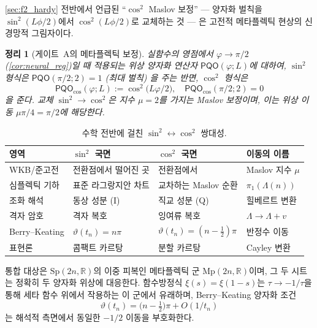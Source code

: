 \documentclass[11pt, a4paper]{article}
\theoremstyle{definition}
\theoremstyle{plain}
\newtheorem{theorem}{정리}[section]
\newcommand{\xif}{\xi}
\newcommand{\PQO}{\mathsf{PQO}}
\begin{document}
\cref{sec:f2_hardy} 전반에서 언급된 ``$\cos^2$ Maslov 보정'' --- 양자화 벌칙을 $\sin^2(L\phi/2)$에서 $\cos^2(L\phi/2)$로 교체하는 것 --- 은 고전적 메타플렉틱 현상의 신경망적 그림자이다.

\begin{theorem}[게이트~A의 메타플렉틱 보정]
\label{thm:maslov}
실함수의 영점에서 $\varphi\to\pi/2$ (\cref{cor:neural_reg})일 때 적용되는 위상 양자화 연산자 $\PQO(\varphi; L)$에 대하여, $\sin^2$ 형식은 $\PQO(\pi/2; 2) = 1$ (최대 벌칙) 을 주는 반면, $\cos^2$ 형식은
\begin{equation}\label{eq:pqo_cos_thm}
  \PQO_{\cos}(\varphi; L) := \cos^2\!\bigl(L\varphi/2\bigr),
  \quad \PQO_{\cos}(\pi/2; 2) = 0
\end{equation}
을 준다. 교체 $\sin^2\to\cos^2$은 지수 $\mu=2$를 가지는 \emph{Maslov 보정}이며, 이는 위상 이동 $\mu\pi/4=\pi/2$에 해당한다.
\end{theorem}

\begin{table}[ht]
\centering
\caption{수학 전반에 걸친 $\sin^2\leftrightarrow\cos^2$ 쌍대성.}
\label{tab:maslov_duality}
\small
\begin{tabular}{@{}p{3cm}|p{3.8cm}|p{3.8cm}|p{3cm}@{}}
\toprule
\textbf{영역} & \textbf{$\sin^2$ 국면} & \textbf{$\cos^2$ 국면} & \textbf{이동의 이름} \\
\midrule
WKB/준고전     & 전환점에서 떨어진 곳
               & 전환점에서
               & Maslov 지수 $\mu$ \\
심플렉틱 기하  & 표준 라그랑지안 차트
               & 교차하는 Maslov 순환
               & $\pi_1(\Lambda(n))$ \\
조화 해석      & 동상 성분 (I)
               & 직교 성분 (Q)
               & 힐베르트 변환 \\
격자 암호      & 격자 복호
               & 잉여류 복호
               & $\Lambda\to\Lambda+v$ \\
Berry--Keating & $\vartheta(t_n)=n\pi$
               & $\vartheta(t_n)=(n-\tfrac12)\pi$
               & 반정수 이동 \\
표현론         & 콤팩트 카르탕
               & 분할 카르탕
               & Cayley 변환 \\
\bottomrule
\end{tabular}
\end{table}

통합 대상은 $\mathrm{Sp}(2n,\mathbb{R})$의 이중 피복인 메타플렉틱 군 $\mathrm{Mp}(2n,\mathbb{R})$이며, 그 두 시트는 정확히 두 양자화 위상에 대응한다. 함수방정식 $\xif(s)=\xif(1-s)$는 $\tau\to-1/\tau$을 통해 세타 함수 위에서 작용하는 이 군에서 유래하며, Berry--Keating 양자화 조건
\begin{equation}\label{eq:berry_keating}
  \vartheta(t_n)=\bigl(n-\tfrac12\bigr)\pi + O(1/t_n)
\end{equation}
는 해석적 측면에서 동일한 $-1/2$ 이동을 부호화한다.
\end{document}
